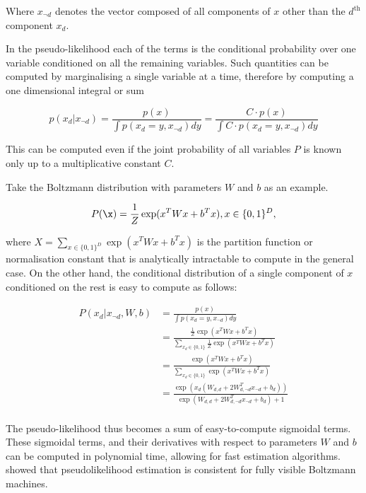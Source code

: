 Where $x_{\neg d}$ denotes the vector composed of all components of $x$ other than the $d^{\mbox{th}}$ component $x_d$. 

In the pseudo-likelihood each of the terms is the conditional probability over one variable conditioned on all the remaining variables. Such quantities can be computed by marginalising a single variable at a time, therefore by computing a one dimensional integral or sum

\begin{equation}
	p(x_d\vert x_{\neg d}) = \frac{p(x)}{\int p(x_d=y,x_{\neg d}) dy} = \frac{C \cdot p(x)}{\int C \cdot p(x_d=y,x_{\neg d}) dy}
\end{equation}

This can be computed even if the joint probability of all variables $P$ is known only up to a multiplicative constant $C$.

Take the Boltzmann distribution with parameters $W$ and $b$ as an example. 

\begin{equation}
	P(\x) = \frac{1}{Z}\exp(x^{T}Wx + b^{T}x), x\in\{0,1\}^D,
\end{equation}

where $X = \sum_{x\in\{0,1\}^D}\exp(x^{T}Wx + b^{T}x)$ is the partition function or normalisation constant that is analytically intractable to compute in the general case. On the other hand, the conditional distribution of a single component of $x$ conditioned on the rest is easy to compute as follows:

\begin{align}
	P(x_d\vert x_{\neg d}, W, b) &= \frac{p(x)}{\int p(x_d=y,x_{\neg d}) dy}\\
		&= \frac{\frac{1}{Z}\exp(x^{T}Wx + b^{T}x)}{\sum_{x_d\in\{0,1\}}\frac{1}{Z}\exp(x^{T}Wx + b^{T}x)}\\
		&= \frac{\exp(x^{T}Wx + b^{T}x)}{\sum_{x_d\in\{0,1\}}\exp(x^{T}Wx + b^{T}x)}\\
		&= \frac{\exp\left( x_d \left( W_{d,d} + 2 W_{d,\neg d}^{T}x_{\neg d} + b_d \right)\right)}{\exp( W_{d,d} + 2 W_{d,\neg d}^{T}x_{\neg d} + b_{d}) + 1}\\
\end{align}

The pseudo-likelihood thus becomes a sum of easy-to-compute sigmoidal terms. These sigmoidal terms, and their derivatives with respect to parameters $W$ and $b$ can be computed in polynomial time, allowing for fast estimation algorithms. \cite{HyvarinnenNeuralComputation} showed that pseudolikelihood estimation is consistent for fully visible Boltzmann machines.

